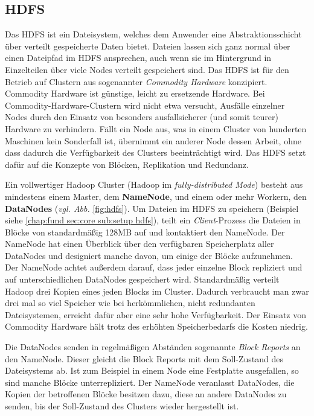 \subsection{HDFS}
\label{chap:fund sec:core sub:hdfs}
Das HDFS ist ein Dateisystem, welches dem Anwender eine Abstraktionsschicht über verteilt gespeicherte Daten bietet. Dateien lassen sich ganz normal über einen Dateipfad im HDFS ansprechen, auch wenn sie im Hintergrund in Einzelteilen über viele Nodes verteilt gespeichert sind. Das HDFS ist für den Betrieb auf Clustern aus sogenannter \textit{Commodity Hardware} konzipiert. Commodity Hardware ist günstige, leicht zu ersetzende Hardware. Bei Commodity-Hardware-Clustern wird nicht etwa versucht, Ausfälle einzelner Nodes durch den Einsatz von besonders ausfallsicherer (und somit teurer) Hardware zu verhindern. Fällt ein Node aus, was in einem Cluster von hunderten Maschinen kein Sonderfall ist, übernimmt ein anderer Node dessen Arbeit, ohne dass dadurch die Verfügbarkeit des Clusters beeinträchtigt wird. Das HDFS setzt dafür auf die Konzepte von Blöcken, Replikation und Redundanz.\cite{white_hadoop_2015}  
\par
Ein vollwertiger Hadoop Cluster (Hadoop im \textit{fully-distributed Mode}) besteht aus mindestens einem Master, dem \textbf{NameNode}, und einem oder mehr Workern, den \textbf{DataNodes} (\textit{vgl. Abb. }\ref{fig:hdfs}). Um Dateien im HDFS zu speichern (Beispiel siehe \ref{chap:fund sec:core sub:setup hdfs}), teilt ein \textit{Client}-Prozess die Dateien in Blöcke von standardmäßig 128MB auf und kontaktiert den NameNode. Der NameNode hat einen Überblick über den verfügbaren Speicherplatz aller DataNodes und designiert manche davon, um einige der Blöcke aufzunehmen. Der NameNode achtet außerdem darauf, dass jeder einzelne Block repliziert und auf unterschiedlichen DataNodes gespeichert wird. Standardmäßig verteilt Hadoop drei Kopien eines jeden Blocks im Cluster. Dadurch verbraucht man zwar drei mal so viel Speicher wie bei herkömmlichen, nicht redundanten Dateisystemen, erreicht dafür aber eine sehr hohe Verfügbarkeit. Der Einsatz von Commodity Hardware hält trotz des erhöhten Speicherbedarfs die Kosten niedrig.\cite{white_hadoop_2015}     
\par
Die DataNodes senden in regelmäßigen Abständen sogenannte \textit{Block Reports} an den NameNode. Dieser gleicht die Block Reports mit dem Soll-Zustand des Dateisystems ab. Ist zum Beispiel in einem Node eine Festplatte ausgefallen, so sind manche Blöcke unterrepliziert. Der NameNode veranlasst DataNodes, die Kopien der betroffenen Blöcke besitzen dazu, diese an andere DataNodes zu senden, bis der Soll-Zustand des Clusters wieder hergestellt ist.

